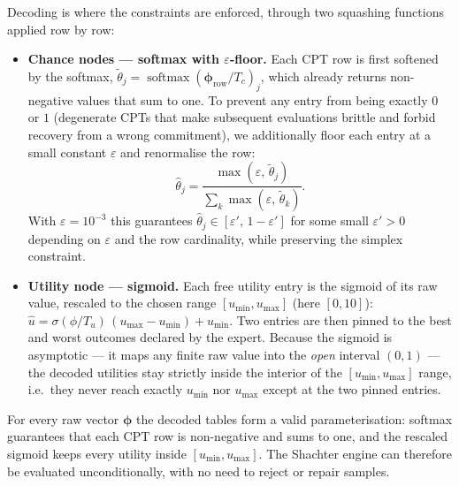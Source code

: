Decoding is where the constraints are enforced, through two squashing
functions applied row by row:

\begin{itemize}
  \item \textbf{Chance nodes --- softmax with $\varepsilon$-floor.}
        Each CPT row is first softened by the softmax,
        $\tilde{\theta}_j = \operatorname{softmax}(\boldsymbol{\phi}_{\text{row}}/T_c)_j$,
        which already returns non-negative values that sum to one. To
        prevent any entry from being exactly $0$ or $1$ (degenerate
        CPTs that make subsequent evaluations brittle and forbid
        recovery from a wrong commitment), we additionally floor each
        entry at a small constant $\varepsilon$ and renormalise the
        row:
        \[
            \hat{\theta}_j = \frac{\max(\varepsilon,\,\tilde{\theta}_j)}
                                  {\sum_k \max(\varepsilon,\,\tilde{\theta}_k)}.
        \]
        With $\varepsilon = 10^{-3}$ this guarantees
        $\hat{\theta}_j \in [\varepsilon',\, 1-\varepsilon']$ for some
        small $\varepsilon'>0$ depending on $\varepsilon$ and the row
        cardinality, while preserving the simplex constraint.
  \item \textbf{Utility node --- sigmoid.} Each free utility entry is the
        sigmoid of its raw value, rescaled to the chosen range
        $[u_{\min},u_{\max}]$ (here $[0,10]$):
        $\hat{u} = \sigma(\phi/T_u)\,(u_{\max}-u_{\min}) + u_{\min}$. Two
        entries are then pinned to the best and worst outcomes declared
        by the expert. Because the sigmoid is
        asymptotic --- it maps any finite raw value into the \emph{open}
        interval $(0,1)$ --- the decoded utilities stay strictly inside the
        interior of the $[u_{\min},u_{\max}]$ range, i.e.\ they never reach
        exactly $u_{\min}$ nor $u_{\max}$ except at the two pinned entries.
\end{itemize}

\begin{proposition}
\label{prop:valid-cpt}
For every raw vector $\boldsymbol{\phi}$ the decoded tables form a valid
parameterisation: softmax guarantees that each CPT row is non-negative
and sums to one, and the rescaled sigmoid keeps every utility inside
$[u_{\min},u_{\max}]$. The Shachter engine can therefore be evaluated
unconditionally, with no need to reject or repair samples.
\end{proposition}

